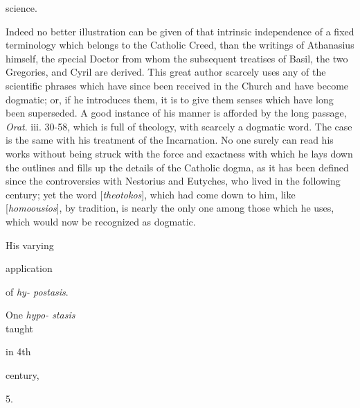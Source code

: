 science.

Indeed no better illustration can be given
of that intrinsic independence of a fixed terminology which
belongs to the Catholic Creed, than the writings of Athanasius
himself, the special Doctor from whom the subsequent treatises
of Basil, the two Gregories, and Cyril are derived. This great
author scarcely uses any of the scientific phrases which have
since been received in the Church and have become dogmatic;
or, if he introduces them, it is to give them senses which
have long been superseded. A good instance of his manner is
afforded by the long passage, \emph{Orat}. iii. 30-58, which
is full of theology, with scarcely a dogmatic word. The
case is the same with his treatment of the Incarnation. No one
surely can read his works without being struck with the force
and exactness with which he lays down the outlines and fills
up the details of the Catholic dogma, as it has been defined
since the controversies with Nestorius and Eutyches, who lived
in the following century; yet the word [\emph{theotokos}],
which had come down to him, like [\emph{homoousios}], by
tradition, is nearly the only one among those which he uses,
which would now be recognized as dogmatic.

His varying

application

of
\emph{hy- postasis}.

One \emph{hypo- stasis}\\
taught

in 4th

century,

5.

